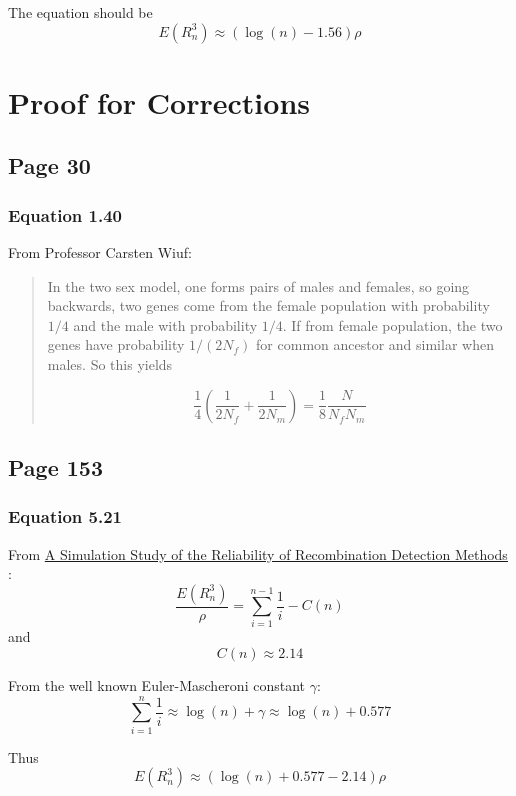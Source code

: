 The equation should be
\[
E(R_n^3) \approx \left( \log(n) - 1.56 \right) \rho
\]


\section{Proof for Corrections}

\subsection{Page 30}

\subsubsection{Equation 1.40}

From Professor Carsten Wiuf:
\begin{quote}
In the two sex model, one forms pairs of males and females, so going backwards,
two genes come from the female population with probability $1/4$ and the male
with probability $1/4$. If from female population, the two genes have
probability $1/(2N_f)$ for common ancestor and similar when males. So this
yields

\[
\frac{1}{4} \left( \frac{1}{2N_f} + \frac{1}{2N_m} \right) = \frac{1}{8} \frac{N}{N_f N_m}
\]
\end{quote}

\subsection{Page 153}

\subsubsection{Equation 5.21}

From \href{https://doi.org/10.1093/oxfordjournals.molbev.a003733}{A
Simulation Study of the Reliability of Recombination Detection Methods}
\cite{wiuf_simulation_2001}:
\[
\frac{ E(R_n^3) }{\rho} = \sum_{i=1}^{n-1} \frac{1}{i} - C(n)
\]
and
\[
C(n) \approx 2.14
\]

From the well known Euler-Mascheroni constant $\gamma$:
\[
\sum_{i=1}^n \frac{1}{i} \approx \log(n) + \gamma \approx \log(n) + 0.577
\]

Thus
\[
E(R_n^3) \approx \left( \log(n) + 0.577 - 2.14 \right) \rho
\]


\printbibliography %

